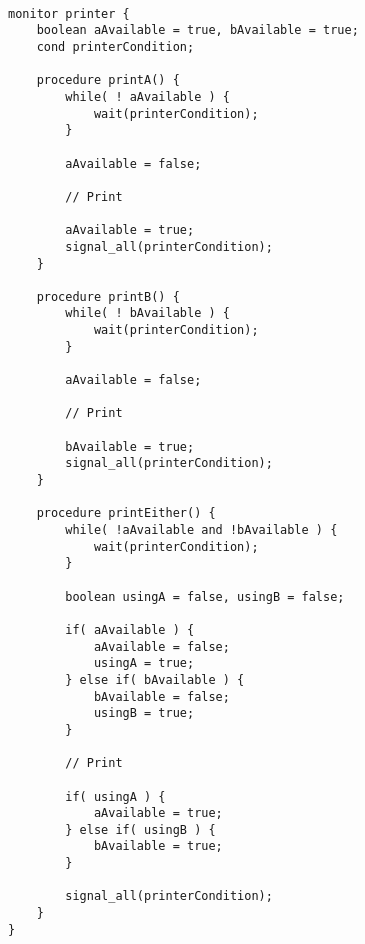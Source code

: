 \documentclass{article}%
\begin{document}
\begin{lstlisting}[frame=single]

monitor printer {
    boolean aAvailable = true, bAvailable = true;
    cond printerCondition;

    procedure printA() {
        while( ! aAvailable ) {
            wait(printerCondition);
        }

        aAvailable = false;

        // Print

        aAvailable = true;
        signal_all(printerCondition);
    }

    procedure printB() {
        while( ! bAvailable ) {
            wait(printerCondition);
        }

        aAvailable = false;

        // Print

        bAvailable = true;
        signal_all(printerCondition);
    }

    procedure printEither() {
        while( !aAvailable and !bAvailable ) {
            wait(printerCondition);
        }

        boolean usingA = false, usingB = false;

        if( aAvailable ) {
            aAvailable = false;
            usingA = true;
        } else if( bAvailable ) {
            bAvailable = false;
            usingB = true;
        }

        // Print

        if( usingA ) {
            aAvailable = true;
        } else if( usingB ) {
            bAvailable = true;
        }

        signal_all(printerCondition);
    }
}

\end{lstlisting}
\end{document}
